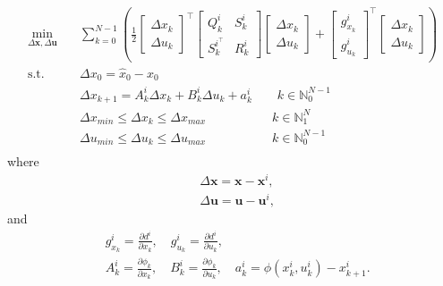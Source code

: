 \begin{equation}\label{QP}
\begin{aligned}
\min_{\Delta \mathbf{x},\Delta \mathbf{u}} \quad & \sum_{k=0}^{N-1}( \frac{1}{2}
\begin{bmatrix}
\Delta x_k\\
\Delta u_k
\end{bmatrix}^\intercal \begin{bmatrix}
Q_k^i & S_k^i \\
S_k^{i^\top} & R_k^i
\end{bmatrix}
\begin{bmatrix}
\Delta x_k\\
\Delta u_k
\end{bmatrix} + \begin{bmatrix}
g_{x_k}^i\\
g_{u_k}^i
\end{bmatrix}^\intercal
\begin{bmatrix}
\Delta x_k\\
\Delta u_k
\end{bmatrix} ) \\
\text{s.t.} \quad & \Delta x_0=\hat{x}_0-x_0\\
& \Delta x_{k+1}=A_{k}^i \Delta x_{k}+ B_{k}^i \Delta u_{k} +a_{k}^i \qquad k \in \mathbb{N}_0^{N-1}\\
& \Delta x_{min}\leq \Delta x_k\leq \Delta x_{max}\qquad\qquad\quad\; k \in \mathbb{N}_1^{N}\\
& \Delta u_{min}\leq \Delta u_k\leq\Delta u_{max}\qquad\qquad\quad\; k \in \mathbb{N}_0^{N-1}\\
\end{aligned}
\end{equation}
where 
\begin{equation}
\begin{aligned}
&\Delta \mathbf{x}=\mathbf{x}-\mathbf{x}^i,\\
&\Delta \mathbf{u}=\mathbf{u}-\mathbf{u}^i,
\end{aligned}
\end{equation}
and
\begin{equation}\label{QP data}
\begin{aligned}
&g_{x_k}^i = \frac{\partial d^i}{\partial x_k},\quad g_{u_k}^i = \frac{\partial d^i}{\partial u_k},\\
&A_k^i=\frac{\partial \phi_k}{\partial x_k}, \quad B_k^i=\frac{\partial \phi_k}{\partial u_k},\quad a_k^i = \phi(x_k^i,u_k^i)-x_{k+1}^i.\\
\end{aligned}
\end{equation}
